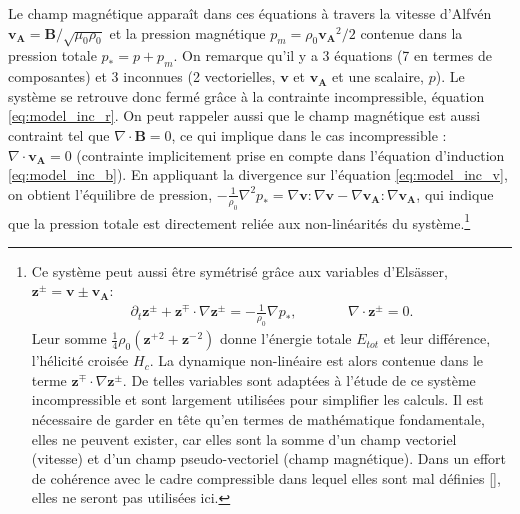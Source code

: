  Le champ magnétique apparaît dans ces équations à travers la vitesse d'Alfvén $\boldsymbol{v_A} = \boldsymbol{B}/\sqrt{\mu_0 \rho_0}$ et la pression magnétique $p_m = \rho_0 \boldsymbol{v_A}^2 /2$ contenue dans la pression totale $p_* = p + p_m$. On remarque qu'il y a 3 équations (7 en termes de composantes) et 3 inconnues (2 vectorielles, $\boldsymbol{v}$ et $\boldsymbol{v_A}$ et une scalaire, $p$). Le système se retrouve donc fermé grâce à la contrainte incompressible, équation \eqref{eq:model_inc_r}. On peut rappeler aussi que le champ magnétique est aussi contraint tel que $\nabla \cdot \boldsymbol{B} = 0$, ce qui implique dans le cas incompressible : $\nabla \cdot \boldsymbol{v_A} = 0$ (contrainte implicitement prise en compte dans l'équation d'induction \eqref{eq:model_inc_b}). En appliquant la divergence sur l'équation \eqref{eq:model_inc_v}, on obtient l'équilibre de pression, $- \frac{1}{\rho_0}\nabla^2 p_* = \nabla \boldsymbol{v} : \nabla \boldsymbol{v} -  \nabla \boldsymbol{v_A} : \nabla \boldsymbol{v_A} $, qui indique que la pression totale est directement reliée aux non-linéarités du système.\footnote{Ce système peut aussi être symétrisé grâce aux variables d'Elsässer, $\boldsymbol{z^{\pm}} = \boldsymbol{v} \pm \boldsymbol{v_A}$: 
 \begin{eqnarray}
 \partial_t \boldsymbol{z^{\pm}} + \boldsymbol{z^{\mp}} \cdot \nabla \boldsymbol{z^{\pm}} = - \frac{1}{\rho_0} \nabla p_* , &\qquad& \nabla \cdot \boldsymbol{z^{\pm}} = 0 .
 \end{eqnarray}
 Leur somme $\frac{1}{4}\rho_0 (\boldsymbol{z^{+}}{}^2 + \boldsymbol{z^{-}}{}^2)$ donne l'énergie totale $E_{tot}$ et leur différence, l'hélicité croisée  $H_c$. La dynamique non-linéaire est alors contenue dans le terme $\boldsymbol{z^{\mp}} \cdot \nabla \boldsymbol{z^{\pm}}$. De telles variables sont adaptées à l'étude de ce système incompressible et sont largement utilisées pour simplifier les calculs. Il est nécessaire de garder en tête qu'en termes de mathématique fondamentale, elles ne peuvent exister, car elles sont la somme d'un champ vectoriel (vitesse) et d'un champ pseudo-vectoriel (champ magnétique). Dans un effort de cohérence avec le cadre compressible dans lequel elles sont mal définies [\cite{magyar_nature_2019}], elles ne seront pas utilisées ici.}
 
